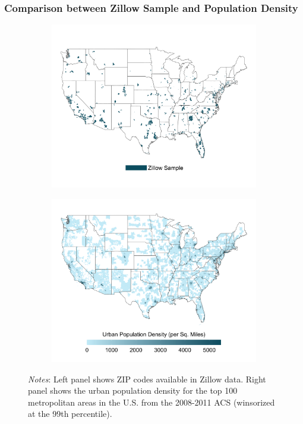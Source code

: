 \begin{frame}[label = zipcodes_map]
	\frametitle{Comparison between Zillow Sample and Population Density}
	
	\vspace{-1mm}
	\begin{figure}
		\begin{subfigure}[t]{.49\textwidth}\centering
			\includegraphics[width = .92\textwidth]
				{../../analysis/descriptive_maps/output/sample_map.png}
		\end{subfigure}
		\begin{subfigure}[t]{.49\textwidth}\centering
			\includegraphics[width = .92\textwidth]
				{../../analysis/descriptive_maps/output/popurban_density_map.png}
		\end{subfigure}
		\begin{minipage}{.95\textwidth} \scriptsize	\vspace{1mm} 
			\textit{Notes}: Left panel shows ZIP codes available in Zillow data. Right 
			panel shows the urban population density for the top 100 metropolitan areas 
			in the U.S. from the 2008-2011 ACS (winsorized at the 99th percentile).
		\end{minipage}
	\end{figure}

	\hyperlink{tab_comparison}{}

\end{frame}

